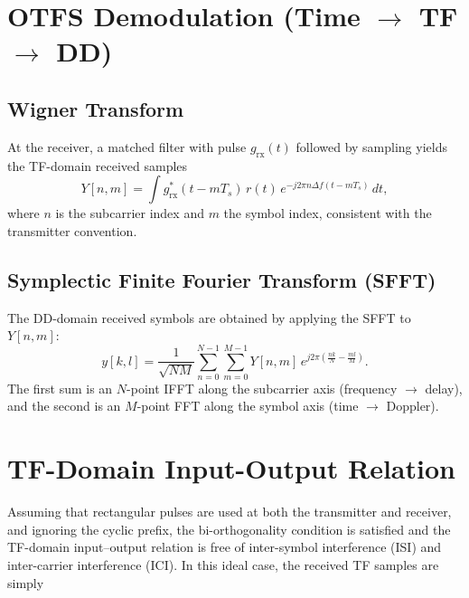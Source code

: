 \documentclass[11pt,a4paper]{article}
\newcommand{\deltaf}{\Delta f}
\begin{document}
\section{OTFS Demodulation (Time $\to$ TF $\to$ DD)}

\subsection{Wigner Transform}

At the receiver, a matched filter with pulse $g_{\mathrm{rx}}(t)$
followed by sampling yields the TF-domain received samples
\begin{equation}
  Y[n,m] = \int g_{\mathrm{rx}}^{*}(t-mT_s)\,r(t)\,
  e^{-j2\pi n\deltaf(t-mT_s)}\,dt,
  \label{eq:wigner}
\end{equation}
where $n$ is the subcarrier index and $m$ the symbol index, consistent
with the transmitter convention.

\subsection{Symplectic Finite Fourier Transform (SFFT)}

The DD-domain received symbols are obtained by applying the SFFT to
$Y[n,m]$:
\begin{equation}
  y[k,l] = \frac{1}{\sqrt{NM}}\sum_{n=0}^{N-1}
  \sum_{m=0}^{M-1}
  Y[n,m]\,e^{j2\pi\!\left(\frac{nk}{N}-\frac{ml}{M}\right)}.
  \label{eq:sfft}
\end{equation}
The first sum is an $N$-point IFFT along the subcarrier axis
(frequency $\to$ delay), and the second is an $M$-point FFT along
the symbol axis (time $\to$ Doppler).

\section{TF-Domain Input-Output Relation}
\label{sec:tf_io}

Assuming that rectangular pulses are used at both the transmitter and receiver, and ignoring the cyclic prefix, the bi-orthogonality condition is satisfied and the TF-domain input--output relation is free of inter-symbol interference (ISI) and inter-carrier interference (ICI). In this ideal case, the received TF samples are simply
\end{document}
